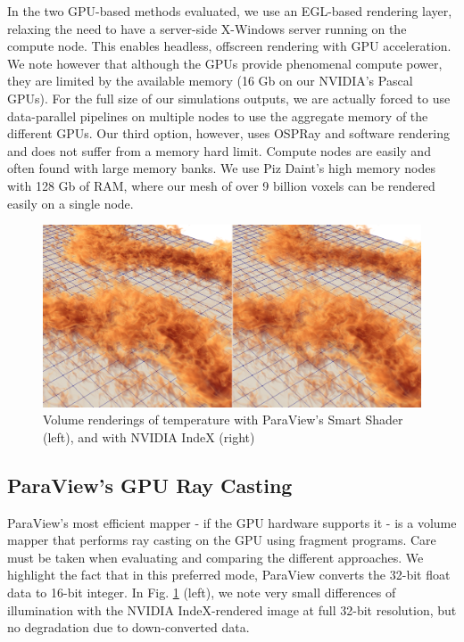 \documentclass[final,5p,times,twocolumn]{elsarticle}
\begin{document}
In the two GPU-based methods evaluated, we use an EGL-based rendering layer,
relaxing the need to have a server-side X-Windows server running on the compute node.
This enables headless, offscreen rendering with GPU acceleration. We note however that although
the GPUs provide phenomenal compute power, they are limited by the available memory
(16 Gb on our NVIDIA's Pascal GPUs). For the full size of our simulations outputs, we are actually forced to use data-parallel
pipelines on multiple nodes to use the aggregate memory of the different GPUs.
\newline
Our third option, however, uses OSPRay and software rendering and does not suffer
from a memory hard limit. Compute nodes are easily and often found with large memory
banks. We use Piz Daint's high memory nodes with 128 Gb of RAM, where our mesh of
over 9 billion voxels can be rendered easily on a single node.

\begin{figure}
	\centering
	\includegraphics[width=\linewidth]{fig2}%
	\caption{\label{fig:gpucloseup} Volume renderings of temperature with ParaView's
Smart Shader (left), and with NVIDIA IndeX (right)}
\end{figure}

\subsection{ParaView's GPU Ray Casting} \label{smart}

ParaView's most efficient mapper - if the GPU hardware supports it - is a volume
mapper that performs ray casting on the GPU using fragment programs. Care must
be taken when evaluating and comparing the different approaches. We highlight the
fact that in this preferred mode, ParaView converts the 32-bit float data to 16-bit
integer. In Fig. \ref{fig:gpucloseup} (left), we note very small differences of illumination with the
NVIDIA IndeX-rendered image at full 32-bit resolution,
but no degradation due to down-converted data.
\end{document}
